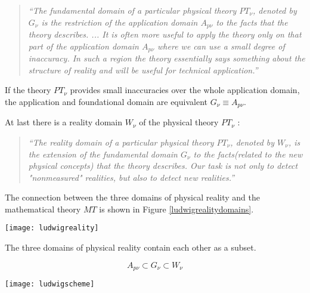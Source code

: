 \documentclass{article}
\begin{document}
\begin{quote}
\textit{``The fundamental domain of a particular physical theory $PT_\nu$, denoted by $G_\nu$ is the restriction of the application domain $A_{p\nu}$ to the facts that the theory describes.
...
It is often more useful to apply the theory only on that part of the application domain $A_{p\nu}$ where we can use a small degree of inaccuracy. In such a region the theory essentially says something about the structure of reality and will be useful for technical application.''}
\end{quote}

If the theory $PT_\nu$ provides small inaccuracies over the whole application domain, the application and foundational domain are equivalent $G_\nu \equiv A_{p\nu}$.

At last there is a reality domain $W_\nu$ of the physical theory $PT_\nu$ \cite[p.14]{ludwig2007new}:

\begin{quote}
\textit{``The reality domain of a particular physical theory $PT_\nu$, denoted by $W_\nu$, is the extension of the fundamental domain $G_\nu$ to the facts(related to the new physical concepts) that the theory describes.
Our task is not only to detect "nonmeasured" realities, but also to detect new realities.''}
\end{quote}

The connection between the three domains of physical reality and the mathematical theory $MT$ is shown in Figure \ref{ludwigrealitydomains}.

\begin{minipage}{\textwidth}

\centering
\texttt{[image: ludwigreality]}
\label{ludwigrealitydomains}
\end{minipage}
\bigskip

The three domains of physical reality contain each other as a subset. 

\begin{equation}
A_{p\nu} \subset G_\nu \subset W_\nu 
\end{equation}


\begin{minipage}{\textwidth}
\centering
\texttt{[image: ludwigscheme]}
\label{ludwigschemecomparision}
\end{minipage}
\bigskip
\end{document}
